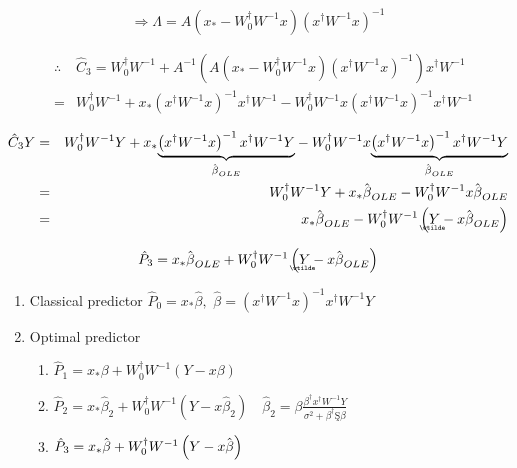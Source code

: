 \documentclass{article}
\begin{document}
\begin{equation*}
\Rightarrow \Lambda =A\left( x_{\ast }-W_{0}^{\dagger }W^{-1}x\right) \left(
x^{\dagger }W^{-1}x\right) ^{-1}
\end{equation*}

\begin{eqnarray*}
&\therefore &\hat{C}_{3}=W_{0}^{\dagger }W^{-1}+A^{-1}\left( A\left( x_{\ast
}-W_{0}^{\dagger }W^{-1}x\right) \left( x^{\dagger }W^{-1}x\right)
^{-1}\right) x^{\dagger }W^{-1} \\
&=&W_{0}^{\dagger }W^{-1}+x_{\ast }\left( x^{\dagger }W^{-1}x\right)
^{-1}x^{\dagger }W^{-1}-W_{0}^{\dagger }W^{-1}x\left( x^{\dagger
}W^{-1}x\right) ^{-1}x^{\dagger }W^{-1}
\end{eqnarray*}

\begin{eqnarray*}
\hat{C}_{3}Y &=&W_{0}^{\dagger }W^{-1}Y+x_{\ast }\underset{\hat{\beta}_{OLE}}%
{\underbrace{\left( x^{\dagger }W^{-1}x\right) ^{-1}x^{\dagger }W^{-1}Y}}%
-W_{0}^{\dagger }W^{-1}x\underset{\hat{\beta}_{OLE}}{\underbrace{\left(
x^{\dagger }W^{-1}x\right) ^{-1}x^{\dagger }W^{-1}Y}} \\
&=&W_{0}^{\dagger }W^{-1}Y+x_{\ast }\hat{\beta}_{OLE}-W_{0}^{\dagger }W^{-1}x%
\hat{\beta}_{OLE} \\
&=&x_{\ast }\hat{\beta}_{OLE}-W_{0}^{\dagger }W^{-1}\left( 
\underaccent{\wtilde}{Y}%
-x\hat{\beta}_{OLE}\right) 
\end{eqnarray*}

\begin{equation*}
\therefore \hat{P}_{3}=x_{\ast }\hat{\beta}_{OLE}+W_{0}^{\dagger
}W^{-1}\left( 
\underaccent{\wtilde}{Y}%
-x\hat{\beta}_{OLE}\right) 
\end{equation*}

\bigskip 

\begin{enumerate}
\item Classical predictor $\hat{P}_{0}=x_{\ast }\hat{\beta},$ $\hat{\beta}%
=\left( x^{\dagger }W^{-1}x\right) ^{-1}x^{\dagger }W^{-1}Y$

\item Optimal predictor

\begin{enumerate}
\item $\hat{P}_{1}=x_{\ast }\beta +W_{0}^{\dagger }W^{-1}\left( Y-x\beta
\right) $

\item $\hat{P}_{2}=x_{\ast }\hat{\beta}_{2}+W_{0}^{\dagger }W^{-1}\left( Y-x%
\hat{\beta}_{2}\right) \quad \hat{\beta}_{2}=\beta \frac{\beta ^{\dagger
}x^{\dagger }W^{-1}Y}{\sigma ^{2}+\beta ^{\dagger }\text{\c{S}}\beta }$

\item $\hat{P}_{3}=x_{\ast }\hat{\beta}+W_{0}^{\dagger }W^{-1}\left( Y-x\hat{%
\beta}\right) $
\end{enumerate}
\end{enumerate}
\end{document}
